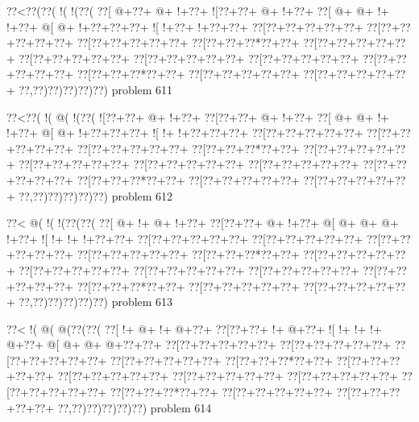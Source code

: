 \vbox{\vbox{\goo
\0??<\0??(\0??(\- !(\- !(\0??(
\0??[\- @+\0??+\- @+\- !+\0??+
\- ![\0??+\0??+\- @+\- !+\0??+
\0??[\- @+\- @+\- !+\- !+\0??+
\- @[\- @+\- !+\0??+\0??+\0??+
\- ![\- !+\0??+\- !+\0??+\0??+
\0??[\0??+\0??+\0??+\0??+\0??+
\0??[\0??+\0??+\0??+\0??+\0??+
\0??[\0??+\0??+\0??+\0??+\0??+
\0??[\0??+\0??+\0??*\0??+\0??+
\0??[\0??+\0??+\0??+\0??+\0??+
\0??[\0??+\0??+\0??+\0??+\0??+
\0??[\0??+\0??+\0??+\0??+\0??+
\0??[\0??+\0??+\0??+\0??+\0??+
\0??[\0??+\0??+\0??+\0??+\0??+
\0??[\0??+\0??+\0??*\0??+\0??+
\0??[\0??+\0??+\0??+\0??+\0??+
\0??[\0??+\0??+\0??+\0??+\0??+
\0??,\0??)\0??)\0??)\0??)\0??)
}
\hfil problem 611\hfil\break
}

\vbox{\vbox{\goo
\0??<\0??(\- !(\- @(\- !(\0??(
\- ![\0??+\0??+\- @+\- !+\0??+
\0??[\0??+\0??+\- @+\- !+\0??+
\0??[\- @+\- @+\- !+\- !+\0??+
\- @[\- @+\- !+\0??+\0??+\0??+
\- ![\- !+\- !+\0??+\0??+\0??+
\0??[\0??+\0??+\0??+\0??+\0??+
\0??[\0??+\0??+\0??+\0??+\0??+
\0??[\0??+\0??+\0??+\0??+\0??+
\0??[\0??+\0??+\0??*\0??+\0??+
\0??[\0??+\0??+\0??+\0??+\0??+
\0??[\0??+\0??+\0??+\0??+\0??+
\0??[\0??+\0??+\0??+\0??+\0??+
\0??[\0??+\0??+\0??+\0??+\0??+
\0??[\0??+\0??+\0??+\0??+\0??+
\0??[\0??+\0??+\0??*\0??+\0??+
\0??[\0??+\0??+\0??+\0??+\0??+
\0??[\0??+\0??+\0??+\0??+\0??+
\0??,\0??)\0??)\0??)\0??)\0??)
}
\hfil problem 612\hfil\break
}

\vbox{\vbox{\goo
\0??<\- @(\- !(\- !(\0??(\0??(
\0??[\- @+\- !+\- @+\- !+\0??+
\0??[\0??+\0??+\- @+\- !+\0??+
\- @[\- @+\- @+\- @+\- !+\0??+
\- ![\- !+\- !+\- !+\0??+\0??+
\0??[\0??+\0??+\0??+\0??+\0??+
\0??[\0??+\0??+\0??+\0??+\0??+
\0??[\0??+\0??+\0??+\0??+\0??+
\0??[\0??+\0??+\0??+\0??+\0??+
\0??[\0??+\0??+\0??*\0??+\0??+
\0??[\0??+\0??+\0??+\0??+\0??+
\0??[\0??+\0??+\0??+\0??+\0??+
\0??[\0??+\0??+\0??+\0??+\0??+
\0??[\0??+\0??+\0??+\0??+\0??+
\0??[\0??+\0??+\0??+\0??+\0??+
\0??[\0??+\0??+\0??*\0??+\0??+
\0??[\0??+\0??+\0??+\0??+\0??+
\0??[\0??+\0??+\0??+\0??+\0??+
\0??,\0??)\0??)\0??)\0??)\0??)
}
\hfil problem 613\hfil\break
}

\vbox{\vbox{\goo
\0??<\- !(\- @(\- @(\0??(\0??(
\0??[\- !+\- @+\- !+\- @+\0??+
\0??[\0??+\0??+\- !+\- @+\0??+
\- ![\- !+\- !+\- !+\- @+\0??+
\- @[\- @+\- @+\- @+\0??+\0??+
\0??[\0??+\0??+\0??+\0??+\0??+
\0??[\0??+\0??+\0??+\0??+\0??+
\0??[\0??+\0??+\0??+\0??+\0??+
\0??[\0??+\0??+\0??+\0??+\0??+
\0??[\0??+\0??+\0??*\0??+\0??+
\0??[\0??+\0??+\0??+\0??+\0??+
\0??[\0??+\0??+\0??+\0??+\0??+
\0??[\0??+\0??+\0??+\0??+\0??+
\0??[\0??+\0??+\0??+\0??+\0??+
\0??[\0??+\0??+\0??+\0??+\0??+
\0??[\0??+\0??+\0??*\0??+\0??+
\0??[\0??+\0??+\0??+\0??+\0??+
\0??[\0??+\0??+\0??+\0??+\0??+
\0??,\0??)\0??)\0??)\0??)\0??)
}
\hfil problem 614\hfil\break
}

